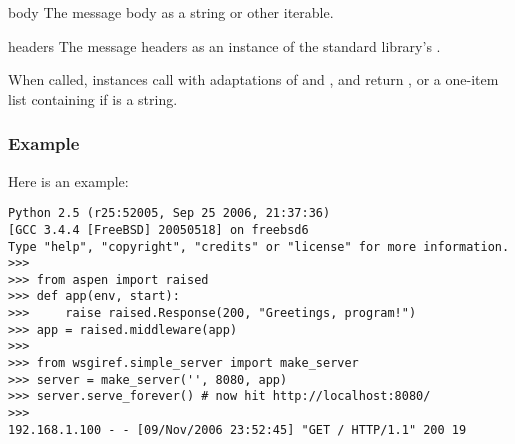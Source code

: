 \begin{datadesc}{body}
The message body as a string or other iterable.
\end{datadesc}

\begin{datadesc}{headers}
The message headers as an instance of the standard library's
.
\end{datadesc}

When called,  instances call  with
adaptations of  and , and return , or a 
one-item list containing  if  is a string.


\subsubsection{Example}

Here is an example:

\begin{verbatim}
Python 2.5 (r25:52005, Sep 25 2006, 21:37:36)
[GCC 3.4.4 [FreeBSD] 20050518] on freebsd6
Type "help", "copyright", "credits" or "license" for more information.
>>>
>>> from aspen import raised
>>> def app(env, start):
>>>     raise raised.Response(200, "Greetings, program!")
>>> app = raised.middleware(app)
>>>
>>> from wsgiref.simple_server import make_server
>>> server = make_server('', 8080, app)
>>> server.serve_forever() # now hit http://localhost:8080/
>>>
192.168.1.100 - - [09/Nov/2006 23:52:45] "GET / HTTP/1.1" 200 19
\end{verbatim}
